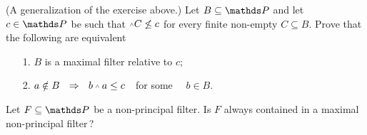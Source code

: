 \documentclass[creche.tex]{subfiles}
\begin{document}
\begin{exercise}
(A generalization of the exercise above.) Let $B\subseteq \PP$ and let $c\in \PP$ be such that $\swedge C\not\le c$ for every finite non-empty $C\subseteq B$. Prove that the following are equivalent
\begin{itemize}
\item[1.] $B$ is a maximal filter relative to $c$;
\item[2.] $a\notin B\ \ \IMP\ \ b\swedge a \le c$\ \  for some \ \ $b\in B$.\QED
\end{itemize}
\end{exercise}


\begin{exercise}
Let $F\subseteq\PP$ be a non-principal filter. Is $F$ always contained in a maximal non-principal filter\,?\QED
\end{exercise}



\end{document}
